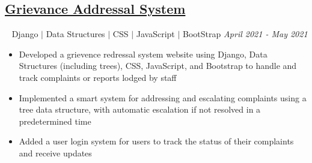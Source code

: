 \documentclass[12pt]{article}
\begin{document}
\subsection*{\href{https://github.com/prabhavagrawal7/grievance-addressal-system}{Grievance Addressal System}}~ Django $\vert$ Data Structures $\vert$ CSS $\vert$ JavaScript $\vert$ BootStrap \hfill \textit{April 2021 - May 2021} \\
\begin{itemize}[topsep=0pt,itemsep=1pt,partopsep=1pt, parsep=1pt]
	\item Developed a grievence redressal system website using Django, Data Structures (including trees), CSS, JavaScript, and Bootstrap to handle and track complaints or reports lodged by staff
	\item Implemented a smart system for addressing and escalating complaints using a tree data structure, with automatic escalation if not resolved in a predetermined time
	\item Added a user login system for users to track the status of their complaints and receive updates
\end{itemize}
\end{document}
